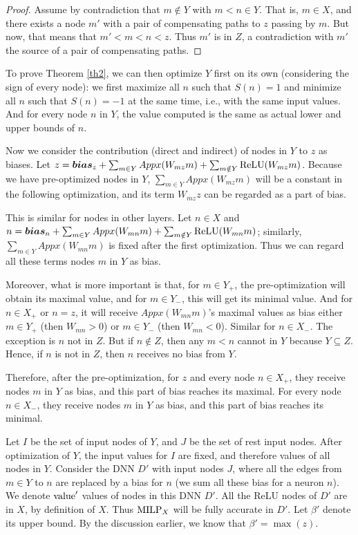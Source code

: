 \begin{proof}
Assume by contradiction that $m \notin Y$ with $m<n \in Y$.
That is, $m \in X$, and there exists a node $m'$ with a pair of compensating paths to $z$
passing by $m$. But now, that means that $m'<m<n<z$.
Thus $m'$ is in $Z$, a contradiction with $m'$ the source of a pair of compensating paths.\end{proof}

To prove Theorem \ref{th2}, we can then optimize $Y$ first on its own (considering the sign of every node): we first maximize all $n$ such that $S(n)=1$ and minimize all $n$ such that 
$S(n)=-1$ at the same time, i.e., with the same input values. And for every node $n$ in $Y$, the value computed is the same as actual lower and upper bounds of $n$.


Now we consider the contribution  (direct and indirect) of nodes in $Y$ to $z$ as biases. Let $z=\boldsymbol{bias}_z+\sum_{m\in Y} Appx(W_{mz}m)+\sum_{m\notin Y} \mathrm{ReLU}(W_{mz}m)$. Because we have pre-optimized nodes in $Y$, $\sum_{m\in Y} Appx(W_{mz}m)$ will be a constant in the following optimization, and its term $W_{mz}z$ can be regarded as a part of bias. 

This is similar for nodes in other layers. Let $n\in X$ and $n=\boldsymbol{bias}_n+\sum_{m\in Y} Appx(W_{mn}m)+\sum_{m\notin Y} \mathrm{ReLU}(W_{mn}m)$; similarly, $\sum_{m\in Y}Appx(W_{mn}m)$ is fixed after the first optimization. Thus we can regard all these terms nodes $m$ in $Y$ as bias.



Moreover, what is more important is that,  for $m\in Y_+$, the pre-optimization will obtain its maximal value, and for $m\in Y_-$, this will get its minimal value. And for $n\in X_+$ or $n=z$, it will receive $Appx(W_{mn}m)$'s maximal values as bias either $m\in Y_+$ (then $W_{mn}>0$) or $m\in Y_-$ (then $W_{mn}<0$). Similar for $n\in X_-$. The exception is $n$ not in $Z$. But if $n\notin Z$, then any $m<n$ cannot in $Y$ because $Y\subseteq Z$.   Hence, if $n$ is not in $Z$, then $n$ receives no bias from $Y$.


Therefore, after the pre-optimization, for $z$ and every node $n\in X_+$, they receive nodes $m$ in $Y$ as bias, and this part of bias reaches its maximal. For every node $n\in X_-$,  they receive nodes $m$ in $Y$ as bias, and this part of bias reaches its minimal.


Let $I$ be the set of input nodes of $Y$, and $J$ be the set of rest input nodes.
After optimization of $Y$, the input values for $I$ are fixed, and therefore values of all nodes in $Y$.
Consider the DNN $D'$ with input nodes $J$, where all the 
edges from $m \in Y$ to $n$ are replaced by a bias for $n$ (we sum all these bias for a neuron $n$).
We denote ${\textrm{value}}'$ values of nodes in this DNN $D'$. All the ReLU nodes of $D'$ are in $X$, by definition of $X$.
Thus ${\textrm{MILP}}_X$ will be fully accurate in $D'$. Let $\beta'$ denote its upper bound. By the discussion earlier, we know that $\beta'=\max(z)$.


